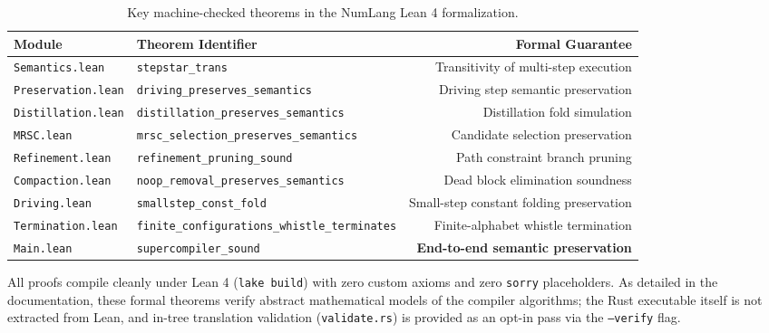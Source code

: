 \begin{table}[t]
\centering
\caption{Key machine-checked theorems in the NumLang Lean 4 formalization.}
\label{tab:lean_lemmas}
\small
\begin{tabular}{llr}
\toprule
\textbf{Module} & \textbf{Theorem Identifier} & \textbf{Formal Guarantee} \\
\midrule
\texttt{Semantics.lean} & \texttt{stepstar\_trans} & Transitivity of multi-step execution \\
\texttt{Preservation.lean} & \texttt{driving\_preserves\_semantics} & Driving step semantic preservation \\
\texttt{Distillation.lean} & \texttt{distillation\_preserves\_semantics} & Distillation fold simulation \\
\texttt{MRSC.lean} & \texttt{mrsc\_selection\_preserves\_semantics} & Candidate selection preservation \\
\texttt{Refinement.lean} & \texttt{refinement\_pruning\_sound} & Path constraint branch pruning \\
\texttt{Compaction.lean} & \texttt{noop\_removal\_preserves_semantics} & Dead block elimination soundness \\
\texttt{Driving.lean} & \texttt{smallstep\_const\_fold} & Small-step constant folding preservation \\
\texttt{Termination.lean} & \texttt{finite\_configurations\_whistle\_terminates} & Finite-alphabet whistle termination \\
\texttt{Main.lean} & \texttt{supercompiler\_sound} & \textbf{End-to-end semantic preservation} \\
\bottomrule
\end{tabular}
\end{table}

All proofs compile cleanly under Lean 4 (\texttt{lake build}) with zero custom axioms and zero \texttt{sorry} placeholders. As detailed in the documentation, these formal theorems verify abstract mathematical models of the compiler algorithms; the Rust executable itself is not extracted from Lean, and in-tree translation validation (\texttt{validate.rs}) is provided as an opt-in pass via the \texttt{--verify} flag.
